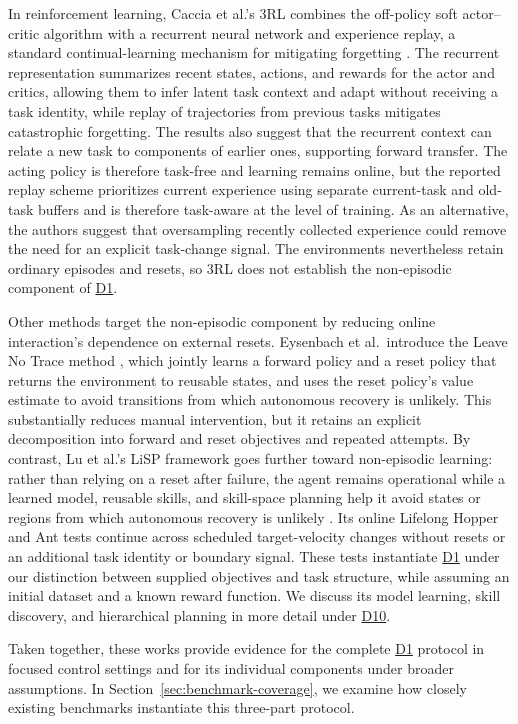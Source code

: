 \documentclass[10pt,journal,compsoc]{IEEEtran}
\DeclareRobustCommand{\Dref}[1]{\hyperref[sec:d#1]{D#1}}
\begin{document}
In reinforcement learning, Caccia et al.'s 3RL \cite{caccia2023} combines the off-policy soft actor--critic algorithm \cite{haarnoja2018} with a recurrent neural network and experience replay, a standard continual-learning mechanism for mitigating forgetting \cite{rolnick2019}.
The recurrent representation summarizes recent states, actions, and rewards for the actor and critics, allowing them to infer latent task context and adapt without receiving a task identity, while replay of trajectories from previous tasks mitigates catastrophic forgetting.
The results also suggest that the recurrent context can relate a new task to components of earlier ones, supporting forward transfer.
The acting policy is therefore task-free and learning remains online, but the reported replay scheme prioritizes current experience using separate current-task and old-task buffers and is therefore task-aware at the level of training.
As an alternative, the authors suggest that oversampling recently collected experience could remove the need for an explicit task-change signal.
The environments nevertheless retain ordinary episodes and resets, so 3RL does not establish the non-episodic component of \Dref{1}.

Other methods target the non-episodic component by reducing online interaction's dependence on external resets.
Eysenbach et al.\ introduce the Leave No Trace method \cite{eysenbach2018}, which jointly learns a forward policy and a reset policy that returns the environment to reusable states, and uses the reset policy's value estimate to avoid transitions from which autonomous recovery is unlikely.
This substantially reduces manual intervention, but it retains an explicit decomposition into forward and reset objectives and repeated attempts.
By contrast, Lu et al.'s LiSP framework goes further toward non-episodic learning: rather than relying on a reset after failure, the agent remains operational while a learned model, reusable skills, and skill-space planning help it avoid states or regions from which autonomous recovery is unlikely \cite{lu2021}.
Its online Lifelong Hopper and Ant tests continue across scheduled target-velocity changes without resets or an additional task identity or boundary signal.
These tests instantiate \Dref{1} under our distinction between supplied objectives and task structure, while assuming an initial dataset and a known reward function.
We discuss its model learning, skill discovery, and hierarchical planning in more detail under \Dref{10}.

Taken together, these works provide evidence for the complete \Dref{1} protocol in focused control settings and for its individual components under broader assumptions.
In Section~\ref{sec:benchmark-coverage}, we examine how closely existing benchmarks instantiate this three-part protocol.
\end{document}
